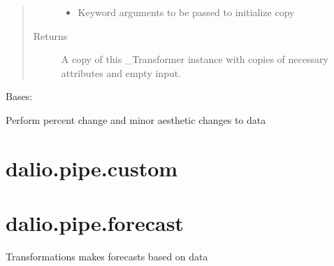 \documentclass[letterpaper,10pt,english]{sphinxmanual}
\begin{document}
\begin{fulllineitems}
\begin{fulllineitems}
\begin{quote}
\begin{description}
\begin{itemize}
\item {} 
 \textendash{} Keyword arguments to be passed to initialize copy

\end{itemize}

\item[{Returns}] \leavevmode
A copy of this \_Transformer instance with copies of necessary
attributes and empty input.

\end{description}\end{quote}

\end{fulllineitems}


\end{fulllineitems}


\begin{fulllineitems}
\label{\detokenize{dalio.pipe:dalio.pipe.col_generation.StockReturns}}
Bases: 

Perform percent change and minor aesthetic changes to data

\end{fulllineitems}



\section{dalio.pipe.custom}
\label{\detokenize{dalio.pipe:dalio-pipe-custom}}

\section{dalio.pipe.forecast}
\label{\detokenize{dalio.pipe:module-dalio.pipe.forecast}}\label{\detokenize{dalio.pipe:dalio-pipe-forecast}}
Transformations makes forecasts based on data
\end{document}
